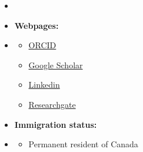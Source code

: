 \documentclass[12pt,oneside]{book}
\begin{document}
 \begin {itemize}
\item [] \phantom \quad  \item   []  {\bf  Webpages:} \vspace{-1.5em}
\item []  {\bf \hrulefill } \vspace{-1em}
\begin {itemize}
\item  \small \href{https://orcid.org/0000-0002-4116-0778 } {ORCID} 
\item \small \href{https://scholar.google.com/citations?user=bVzQEKkAAAAJ&hl=en&oi=ao  } { Google Scholar}
\item \small \href{https://www.linkedin.com/in/moslemheidarpur/   } {Linkedin}
\item \small \href{https://www.researchgate.net/profile/Moslem-Heidarpur/} {Researchgate}
\end{itemize}  \vspace{0.5em}
\item  []  {\bf  Immigration status:}  \vspace{-1.5em}
\item []  {\bf \hrulefill } \vspace{-1em}
\begin {itemize} \item \small Permanent resident of Canada
\end {itemize}   \vspace{0.5em}

\end{itemize}
\end{document}
